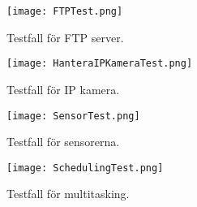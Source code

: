 \begin{figure}[h]
  \texttt{[image: FTPTest.png]}
  \caption{Testfall för FTP server.}
  \label{fig:FTPTest}
\end{figure}

\begin{figure}[h]
  \texttt{[image: HanteraIPKameraTest.png]}
  \caption{Testfall för IP kamera.}
  \label{fig:HanteraIPKameraTest}
\end{figure}

\begin{figure}[h]
  \texttt{[image: SensorTest.png]}
  \caption{Testfall för sensorerna.}
  \label{fig:SensorTest}
\end{figure}

\begin{figure}[h]
  \texttt{[image: SchedulingTest.png]}
  \caption{Testfall för multitasking.}
  \label{fig:SchedulingTest}
\end{figure}




